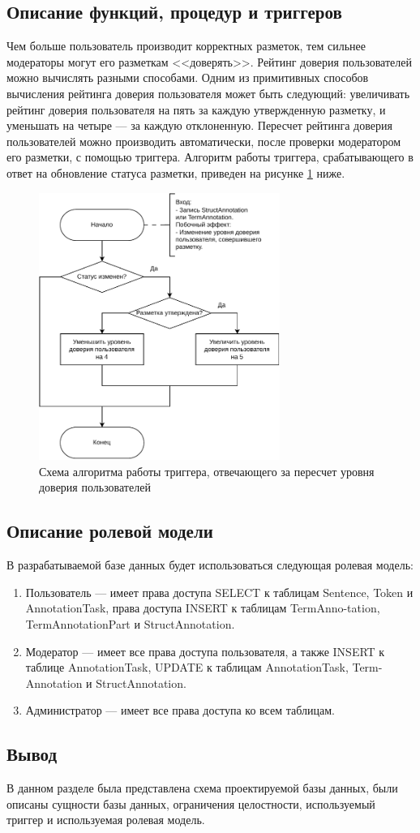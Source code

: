 \subsection{Описание функций, процедур и триггеров}

Чем больше пользователь производит корректных разметок, тем сильнее модераторы могут его разметкам <<доверять>>.
Рейтинг доверия пользователей можно вычислять разными способами.
Одним из примитивных способов вычисления рейтинга доверия пользователя может быть следующий: увеличивать рейтинг доверия пользователя на пять за каждую утвержденную разметку, и уменьшать на четыре --- за каждую отклоненную.
Пересчет рейтинга доверия пользователей можно производить автоматически, после проверки модератором его разметки, с помощью триггера.
Алгоритм работы триггера, срабатывающего в ответ на обновление статуса разметки, приведен на рисунке \ref{fig:trig} ниже.

\begin{figure}[H]
	\centering
	\includegraphics[width=0.7\textwidth]{diag/trig-v3.pdf}
	\caption{Схема алгоритма работы триггера, отвечающего за пересчет уровня доверия пользователей}
	\label{fig:trig}
\end{figure}

\subsection{Описание ролевой модели}

В разрабатываемой базе данных будет использоваться следующая ролевая модель:
\begin{enumerate}
    \item Пользователь --- имеет права доступа SELECT к таблицам Sentence, Token и AnnotationTask, права доступа INSERT к таблицам TermAnno-tation, TermAnnotationPart и StructAnnotation.
    \item Модератор --- имеет все права доступа пользователя, а также INSERT к таблице AnnotationTask, UPDATE к таблицам AnnotationTask, Term-Annotation и StructAnnotation.
    \item Администратор --- имеет все права доступа ко всем таблицам.
\end{enumerate}

\subsection*{Вывод}

В данном разделе была представлена схема проектируемой базы данных, были описаны сущности базы данных, ограничения целостности, используемый триггер и используемая ролевая модель.
